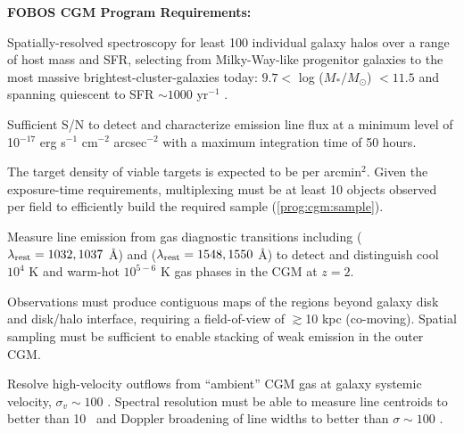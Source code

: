 \documentclass[11pt,a4paper,twoside,onecolumn,openany,final,oldfontcommands]{memoir}
\begin{document}
\noindent \textbf{FOBOS CGM Program Requirements:}

\begin{programrequirement}
\reqitem Spatially-resolved spectroscopy for least 100 individual galaxy halos over a range of host mass and SFR, selecting from Milky-Way-like progenitor galaxies to the most massive brightest-cluster-galaxies today: $9.7 <$ log ($M_*/M_\odot$) $< 11.5$ and spanning quiescent to SFR $\sim 1000$ yr$^{-1}$ . \label{prog:cgm:sample}

\reqitem Sufficient S/N to detect and characterize emission line flux at a minimum level of  10$^{-17}$ erg s$^{-1}$ cm$^{-2}$ arcsec$^{-2}$ with a maximum integration time of 50 hours.

\reqitem The target density of viable targets is expected to be  per arcmin$^2$.  Given the exposure-time requirements, multiplexing must be at least 10 objects observed per field to efficiently build the required sample (\ref{prog:cgm:sample}).
\end{programrequirement}

\medskip
\begin{sciencerequirement}
\reqitem Measure line emission from gas diagnostic transitions including  ($\lambda_{\rm rest} = 1032, 1037$ \AA) and  ($\lambda_{\rm rest} = 1548, 1550$ \AA) to detect and distinguish cool $10^4$ K and warm-hot $10^{5-6}$ K gas phases in the CGM at $z = 2$. 

\reqitem Observations must produce contiguous maps of the regions beyond galaxy disk and disk/halo interface, requiring a field-of-view of $\gtrsim$10 kpc (co-moving).
\reqitem Spatial sampling must be sufficient to enable stacking of weak emission in the outer CGM.

\reqitem Resolve high-velocity outflows from ``ambient'' CGM gas at galaxy systemic velocity, $\sigma_v \sim 100$ \kms.  
\reqitem Spectral resolution must be able to measure line centroids to better than 10 \kms\ and Doppler broadening of line widths to better than $\sigma \sim 100$ \kms. 
\end{sciencerequirement}


\end{document}
